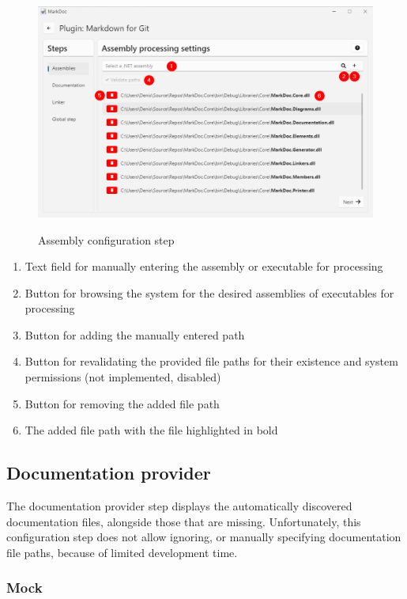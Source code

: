 \begin{figure}[H]
    \caption{Assembly configuration step}
    \includegraphics[width=\linewidth]{img/pluginMember.png}
    \label{fig:pluginMember}
\end{figure}

\begin{enumerate}
    \item Text field for manually entering the assembly or executable for processing
    \item Button for browsing the system for the desired assemblies of executables for processing
    \item Button for adding the manually entered path
    \item Button for revalidating the provided file paths for their existence and system permissions (not implemented, disabled)
    \item Button for removing the added file path
    \item The added file path with the file highlighted in bold
\end{enumerate}

\subsection{Documentation provider}

The documentation provider step displays the automatically discovered documentation files, alongside those that are missing. Unfortunately, this configuration step does not allow ignoring, or manually specifying documentation file paths, because of limited development time.

\subsubsection{Mock}


